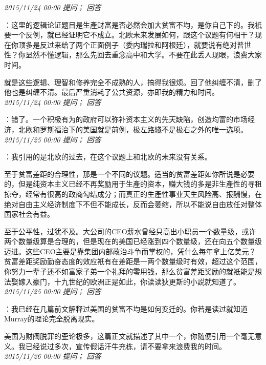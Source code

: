 \documentclass[twocolumn]{ctexart}
\begin{document}
\textit{\hfill\noindent\small 2015/11/24 00:00 提问； 回答}

：这里的逻辑论证题目是生產财富是否必然会加大贫富不均，是你自己下的。我衹要一个反例，就已经证明它不成立。北欧未来发展如何，跟这个议题有何相干？现在你顶多是反过来给了两个正面例子（委内瑞拉和阿根廷），就要说有绝对普世性？你显然不懂逻辑，那么先回去重念高中和大学。不要在此丢人现眼，浪费大家时间。

就是这些逻辑、理智和修养完全不成熟的人，搞得我很烦。回了他纠缠不清，删了他也是纠缠不清。最后严重消耗了公共资源，亦即我的精力和时间。\\

\textit{\hfill\noindent\small 2015/11/24 00:00 提问； 回答}

：错了。一个积极有为的政府可以弥补资本主义的先天缺陷，创造均富的市场经济，北欧和罗斯福治下的美国就是前例，极左路綫不是极右之外的唯一选项。\\

\textit{\hfill\noindent\small 2015/11/25 00:00 提问； 回答}

：我引用的是北欧的过去，在这个议题上和北欧的未来没有关系。

至于贫富差距的合理性，那是一个不同的议题。适当的贫富差距如你所说是必要的，但是纯资本主义已经不再奖励用于生產的资本，赚大钱的多是非生產性的寻租掠夺，经常有很高的政商勾结成分；而真正的生產性事业天生风险高、报酬慢，在绝对自由主义经济制度下不但不能成长，反而会萎缩，所以不能说自由放任对整体国家社会有益。

至于公平性，过犹不及。大公司的CEO薪水曾经只高出小职员一个数量级，或许两个数量级算是合理的，但是现在的美国已经涨到四个数量级，还在向五个数量级迈进。这些CEO主要是靠集团内部政治斗争而掌权的，凭什么每年拿上亿美元？贫富差距奖励勤奋态度的效应衹有在差距是一两个数量级时有效，超过这个范围，你努力一辈子还不如富家子弟一个礼拜的零用钱，那么贫富差距奖励的就衹能是想法娶嫁入豪门，十九世纪的欧洲正是如此，你读读狄更斯的小説就知道了。\\

\textit{\hfill\noindent\small 2015/11/25 00:00 提问； 回答}

：我已经在几篇前文解释过美国的贫富不均是如何变迁的。你若是读过就知道Murray的理论完全脱离现实。

美国为财阀脱罪的歪论极多，这篇正文就描述了其中一个，你随便引用一个毫无意义。我已经说过多次，宣传假话汗牛充栋，请不要拿来浪费我的时间。\\

\textit{\hfill\noindent\small 2015/11/26 00:00 提问； 回答}
\end{document}
